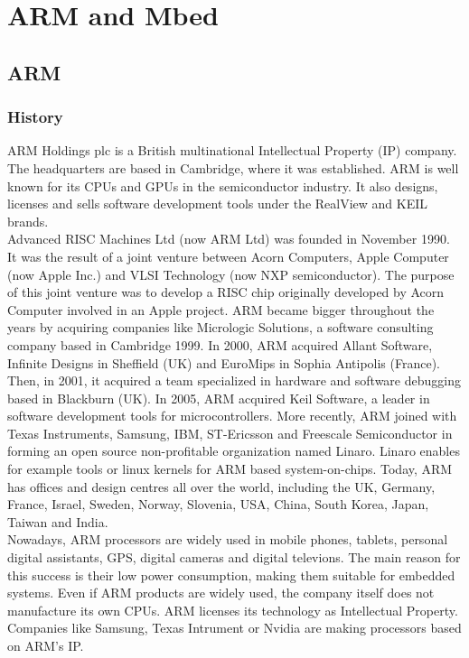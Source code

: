 \documentclass[pdftex,10pt,a4paper]{report}
\begin{document}
\tableofcontents

\chapter{ARM and Mbed}
\section{ARM}
\subsection{History}
ARM Holdings plc is a British multinational Intellectual Property (IP) company. The headquarters are based in Cambridge, where it was established. ARM is well known for its CPUs and GPUs in the semiconductor industry. It also designs, licenses and sells software development tools under the RealView and KEIL brands.
\\

Advanced RISC Machines Ltd (now ARM Ltd) was founded in November 1990. It was the result of a joint venture between Acorn Computers, Apple Computer (now Apple Inc.) and VLSI Technology (now NXP semiconductor). The purpose of this joint venture was to develop a RISC chip originally developed by Acorn Computer involved in an Apple project. ARM became bigger throughout the years by acquiring companies like Micrologic Solutions, a software consulting company based in Cambridge 1999. In 2000, ARM acquired Allant Software, Infinite Designs in Sheffield (UK) and EuroMips in Sophia Antipolis (France). Then, in 2001, it acquired a team specialized in hardware and software debugging based in Blackburn (UK). In 2005, ARM acquired Keil Software, a leader in software development tools for microcontrollers. More recently, ARM joined with Texas Instruments, Samsung, IBM, ST-Ericsson and Freescale Semiconductor in forming an open source non-profitable organization named Linaro. Linaro enables for example tools or linux kernels for ARM based system-on-chips. Today, ARM has offices and design centres all over the world, including the UK, Germany, France, Israel, Sweden, Norway, Slovenia, USA, China, South Korea, Japan, Taiwan and India. 
\\

Nowadays, ARM processors are widely used in mobile phones, tablets, personal digital assistants, GPS, digital cameras and digital televions. The main reason for this success is their low power consumption, making them suitable for embedded systems. Even if ARM products are widely used, the company itself does not manufacture its own CPUs. ARM licenses its technology as Intellectual Property. Companies like Samsung, Texas Intrument or Nvidia are making processors based on ARM's IP.
\end{document}
